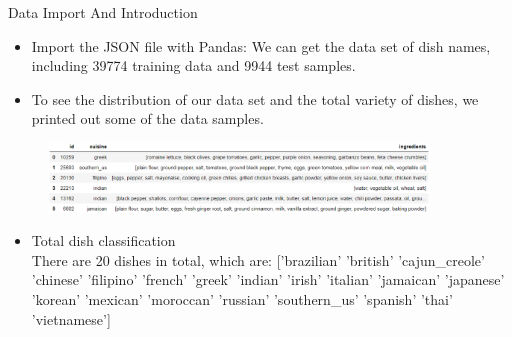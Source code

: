 \documentclass[
 size=14pt,
 paper=smartboard,  %
 mode=present, 		%
 display=slides, 	%
 style=tuliplab,  	%
 pauseslide,
 fleqn,leqno]{powerdot}
\begin{document}
\begin{slide}{Data Import And Introduction}
  \begin{center}

    {
      \begin{itemize}
        \item
        Import the JSON file with Pandas:
        We can get the data set of dish names, including 39774 training data and 9944 test samples.
        \item To see the distribution of our data set and the total variety of dishes, we printed out some of the data samples.
      \end{itemize}  
      
      \begin{figure}
        \centering
        \includegraphics[width=0.9\textwidth]{pic01/a .eps}
      \end{figure}
      \begin{itemize}
        \item
        Total dish classification\\
        There are 20 dishes in total, which are:
        ['brazilian' 'british' 'cajun_creole' 'chinese' 'filipino' 'french'
         'greek' 'indian' 'irish' 'italian' 'jamaican' 'japanese' 'korean'
         'mexican' 'moroccan' 'russian' 'southern_us' 'spanish' 'thai'
         'vietnamese']
        
      \end{itemize}  
    
       
    }
    \end{center}
    \bigskip
    \begin{center}
    
    \end{center}
    \bigskip



\end{slide}
\end{document}
